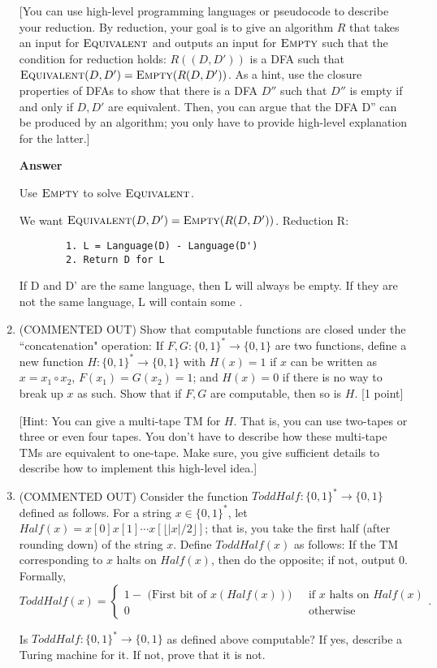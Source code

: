 \documentclass[11pt]{article}
\newcommand \kw[1]{\textbf{#1}}
\newenvironment{answer}{
\vspace{.5cm}
\begin{mdframed}[]
    \kw{Answer} 
}
{
\end{mdframed}
\pagebreak
}
\begin{document}
\begin{enumerate}
[You can use high-level programming languages or pseudocode to describe your reduction. By reduction, your goal is to give an algorithm $R$ that takes an input for $\textsc{Equivalent}$ and outputs an input for $\textsc{Empty}$ such that the condition for reduction holds: $R((D,D'))$ is a DFA such that $\textsc{Equivalent}(D,D') = \textsc{Empty}(R(D,D'))$. As a hint, use the closure properties of DFAs to show that there is a DFA $D''$ such that $D''$ is empty if and only if $D,D'$ are equivalent. Then, you can argue that the DFA D'' can be produced by an algorithm; you only have to provide high-level explanation for the latter.]

\begin{answer}
    
    Use $\textsc{Empty}$ to solve $\textsc{Equivalent}$. 

    We want $\textsc{Equivalent}(D, D') = \textsc{Empty}(R(D, D'))$.
    Reduction R:
    \begin{verbatim}
        1. L = Language(D) - Language(D')
        2. Return D for L
    \end{verbatim}

    If D and D' are the same language, then L will always be empty. If they are not the same language, L will contain some .

\end{answer}

\item (COMMENTED OUT) Show that computable functions are closed under the ``concatenation" operation: If $F,G:\{0,1\}^* \rightarrow \{0,1\}$ are two functions, define a new function $H:\{0,1\}^* \rightarrow \{0,1\}$ with $H(x) = 1$ if $x$ can be written as $x = x_1 \circ x_2$, $F(x_1) = G(x_2) = 1$; and $H(x) = 0$ if there is no way to break up $x$ as such. Show that if $F,G$ are computable, then so is $H$. [1 point]

[Hint: You can give a multi-tape TM for $H$. That is, you can use two-tapes or three or even four tapes. You don't have to describe how these multi-tape TMs are equivalent to one-tape. Make sure, you give sufficient details to describe how to implement this high-level idea.]

\item (COMMENTED OUT) Consider the function $ToddHalf:\{0,1\}^* \rightarrow \{0,1\}$ defined as follows. For a string $x \in \{0,1\}^*$, let $Half(x) = x[0] x[1] \cdots x[\lfloor |x|/2 \rfloor]$; that is, you take the first half (after rounding down) of the string $x$. Define $ToddHalf(x)$ as follows: If the TM corresponding to $x$ halts on $Half(x)$, then do the opposite; if not, output $0$. Formally,
$$
ToddHalf(x) = \begin{cases} 1 - \text{ (First bit of $x(Half(x))$) } &\text{ if $x$ halts on $Half(x)$}\\
0  &\text{ otherwise} 
\end{cases}.
$$

Is $ToddHalf:\{0,1\}^* \rightarrow \{0,1\}$ as defined above computable? If yes, describe a Turing machine for it. If not, prove that it is not.
\end{enumerate}
\end{document}
